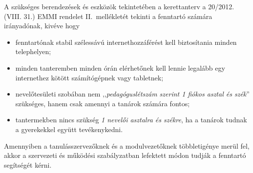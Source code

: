 A szükséges berendezések és eszközök tekintetében a kerettanterv a	20/2012. (VIII. 31.) EMMI rendelet II.~mellékletét tekinti a fenntartó számára irányadónak, kivéve hogy
\begin{itemize}
    \item fenntartónak stabil szélessávú internethozzáférést kell biztosítania minden telephelyen;
    \item minden tanteremben minden órán elérhetőnek kell lennie legalább egy internethez kötött számítógépnek vagy tabletnek;
    \item nevelőtesületi szobában nem ,,\emph{pedagóguslétszám szerint 1 fiókos asztal és szék}'' szükséges, hanem csak amennyi a tanárok számára fontos;
    \item tantermekben nincs szükség \emph{1 nevelői asztalra és székre}, ha a tanárok tudnak a gyerekekkel együtt tevékenykedni.
\end{itemize}

Amennyiben a tanulásszervezőknek és a modulvezetőknek többletigénye merül fel, akkor a szervezeti és működési szabályzatban lefektett módon tudják a fenntartó segítségét kérni.
